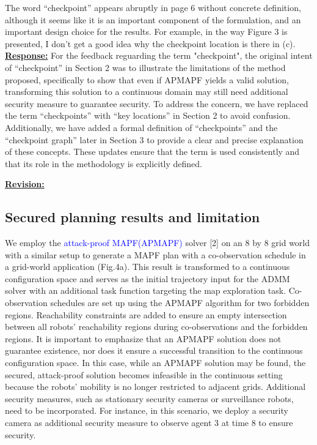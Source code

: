 \documentclass{article}
\newcommand{\re}{\tcblower \underline{\textbf{Response:}}\quad}
\newcommand{\rv}{{\large{\underline{\textbf{Revision:}}}}\quad}
\newcommand{\new}[1]{\textcolor{blue}{#1}}
\newcommand{\news}{\color{blue}}
\begin{document}
\vspace{0.2cm}
\begin{cmt}{}{}
	The word “checkpoint” appears abruptly in page 6 without concrete
	definition, although it seems like it is an important component of the
	formulation, and an important design choice for the results. For
	example, in the way Figure 3 is presented, I don't get a good idea why
	the checkpoint location is there in (c). 
	\re 
	\noindent
 For the feedback reguarding the term "checkpoint", the original intent of “checkpoint” in Section 2 was to illustrate the limitations of the method proposed, specifically to show that even if APMAPF yields a valid solution, transforming this solution to a continuous domain may still need additional security measure to guarantee security. To address the concern, we have replaced the term “checkpoints” with “key locations” in Section 2 to avoid confusion. Additionally, we have added a formal definition of “checkpoints” and the “checkpoint graph” later in Section 3 to provide a clear and precise explanation of these concepts. These updates ensure that the term is used consistently and that its role in the methodology is explicitly defined. 
\end{cmt}
\rv
\renewcommand\thesubsection{H}
\subsection{Secured planning results and limitation}\label{sec:ADMM-simulation}
We employ the \new{attack-proof MAPF(APMAPF)} solver [2] on an 8 by 8 grid world with a similar setup to generate a MAPF plan with a co-observation schedule in a grid-world application (Fig.4a). This result is transformed to a continuous configuration space and serves as the initial trajectory input for the ADMM solver with an additional task function targeting the map exploration task. Co-observation schedules are set up using the APMAPF algorithm for two forbidden regions. Reachability constraints are added to ensure an empty intersection between all robots' reachability regions during co-observations and the forbidden regions. {\news It is important to emphasize that an APMAPF solution does not guarantee existence, nor does it ensure a successful transition to the continuous configuration space. In this case, while an APMAPF solution may be found, the secured, attack-proof solution becomes infeasible in the continuous setting because the robots' mobility is no longer restricted to adjacent grids. Additional security measures, such as stationary security cameras or surveillance robots, need to be incorporated. For instance, in this scenario, we deploy a security camera as additional security measure to observe agent 3 at time $8$ to ensure security.}
\end{document}
